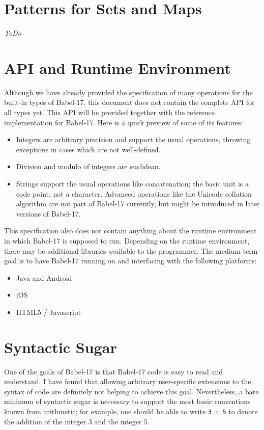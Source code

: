 \documentclass[11pt]{amsart}
\begin{document}
\section{Patterns for Sets and Maps}\label{sec-setmap-patterns}
\emph{ToDo} 

\section{API and Runtime Environment}
Although we have already provided the specification of many operations for the built-in types of Babel-17, this document does not contain the complete API for all types yet. This API will be provided together with the reference implementation for Babel-17. Here is a quick preview of some of its features:
\begin{itemize}
\item Integers are arbitrary precision and support the usual operations, throwing exceptions in cases which are not well-defined. 
\item Division and modulo of integers are euclidean. 
\item Strings support the usual operations like concatenation; the basic unit is a code point, not a character. Advanced operations like the Unicode collation algorithm are not part of Babel-17 currently, but might be introduced in later versions of Babel-17.
\end{itemize}
This specification also does not contain anything about the runtime environment in which Babel-17 is supposed to run. Depending on the runtime environment, there may be additional libraries available to the programmer. 
The medium term goal is to have Babel-17 running on and interfacing with the following platforms:
\begin{itemize}
\item Java and Android
\item iOS 
\item HTML5 / Javascript 
\end{itemize}

\section{Syntactic Sugar}
One of the goals of Babel-17 is that Babel-17 code is easy to read and understand. I have found that allowing arbitrary user-specific extensions to the syntax of code are definitely not helping to achieve this goal. Nevertheless, a bare minimum of syntactic sugar is necessary to support the most basic conventions known from arithmetic; for example, one should be able to write \texttt{3 + 5} to denote the addition of the integer 3 and the integer 5.
\end{document}
